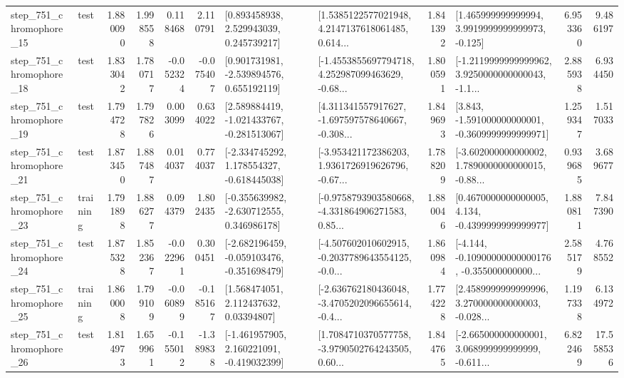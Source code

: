 \begin{tabular}{llrrrrllrlrr}
  step\_751\_chromophore\_15 &      test &      1.880090 &    1.998558 &      0.118468 &  2.110791 &     [0.893458938, 2.529943039, 0.245739217] &  [1.5385122577021948, 4.2147137618061485, 0.614... &       1.841392 &    [1.465999999999994, 3.9919999999999973, -0.125] &            6.953360 &          9.486197 \\
  step\_751\_chromophore\_18 &      test &      1.833042 &    1.780717 &     -0.052324 & -0.075407 &    [0.901731981, -2.539894576, 0.655192119] &  [-1.4553855697794718, 4.252987099463629, -0.68... &       1.800591 &  [-1.2119999999999962, 3.9250000000000043, -1.1... &            2.885938 &          6.934450 \\
  step\_751\_chromophore\_19 &      test &      1.794728 &    1.797826 &      0.003099 &  0.634022 &   [2.589884419, -1.021433767, -0.281513067] &  [4.311341557917627, -1.697597578640667, -0.308... &       1.849693 &   [3.843, -1.591000000000001, -0.3609999999999971] &            1.259347 &          1.517033 \\
  step\_751\_chromophore\_21 &      test &      1.873450 &    1.887487 &      0.014037 &  0.774037 &   [-2.334745292, 1.178554327, -0.618445038] &  [-3.953421172386203, 1.9361726919626796, -0.67... &       1.788209 &  [-3.602000000000002, 1.7890000000000015, -0.88... &            0.939685 &          3.689677 \\
  step\_751\_chromophore\_23 &  training &      1.791898 &    1.886277 &      0.094379 &  1.802435 &   [-0.355639982, -2.630712555, 0.346986178] &  [-0.9758793903580668, -4.331864906271583, 0.85... &       1.880046 &   [0.4670000000000005, 4.134, -0.4399999999999977] &            1.880811 &          7.847390 \\
  step\_751\_chromophore\_24 &      test &      1.875328 &    1.852367 &     -0.022961 &  0.300451 &  [-2.682196459, -0.059103476, -0.351698479] &  [-4.507602010602915, -0.2037789643554125, -0.0... &       1.860984 &  [-4.144, -0.10900000000000176, -0.355000000000... &            2.585179 &          4.768552 \\
  step\_751\_chromophore\_25 &  training &      1.860008 &    1.799109 &     -0.060899 & -0.185167 &      [1.568474051, 2.112437632, 0.03394807] &  [-2.636762180436048, -3.4705202096655614, -0.4... &       1.774228 &  [2.4589999999999996, 3.270000000000003, -0.028... &            1.197338 &          6.134972 \\
  step\_751\_chromophore\_26 &      test &      1.814973 &    1.659961 &     -0.155012 & -1.389838 &   [-1.461957905, 2.160221091, -0.419032399] &  [1.7084710370577758, -3.9790502764243505, 0.60... &       1.844765 &  [-2.665000000000001, 3.068999999999999, -0.611... &            6.822469 &         17.558536 \\

\end{tabular}
